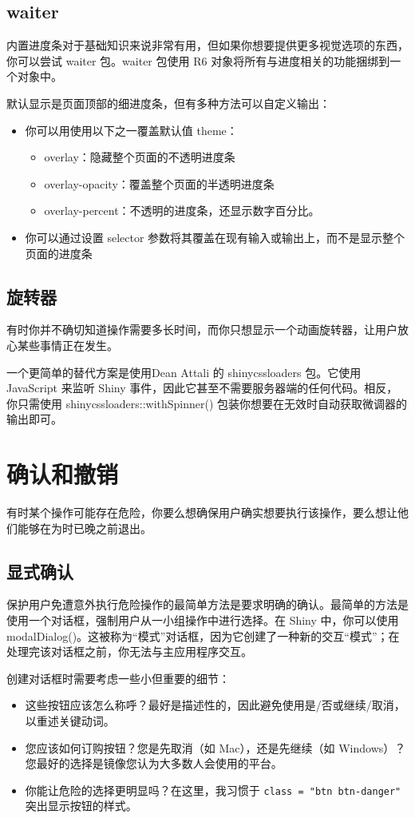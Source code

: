 \subsection{waiter}
内置进度条对于基础知识来说非常有用，但如果你想要提供更多视觉选项的东西，你可以尝试 waiter 包。waiter 包使用 R6 对象将所有与进度相关的功能捆绑到一个对象中。

默认显示是页面顶部的细进度条，但有多种方法可以自定义输出：
\begin{itemize}
    \item 你可以用使用以下之一覆盖默认值 theme：
          \begin{itemize}
              \item overlay：隐藏整个页面的不透明进度条
              \item overlay-opacity：覆盖整个页面的半透明进度条
              \item overlay-percent：不透明的进度条，还显示数字百分比。
          \end{itemize}
    \item 你可以通过设置 selector 参数将其覆盖在现有输入或输出上，而不是显示整个页面的进度条
\end{itemize}

\subsection{旋转器}
有时你并不确切知道操作需要多长时间，而你只想显示一个动画旋转器，让用户放心某些事情正在发生。

一个更简单的替代方案是使用Dean Attali 的 shinycssloaders 包。它使用 JavaScript 来监听 Shiny 事件，因此它甚至不需要服务器端的任何代码。相反，你只需使用 shinycssloaders::withSpinner() 包装你想要在无效时自动获取微调器的输出即可。

\section{确认和撤销}
有时某个操作可能存在危险，你要么想确保用户确实想要执行该操作，要么想让他们能够在为时已晚之前退出。
\subsection{显式确认}
保护用户免遭意外执行危险操作的最简单方法是要求明确的确认。最简单的方法是使用一个对话框，强制用户从一小组操作中进行选择。在 Shiny 中，你可以使用 modalDialog()。这被称为“模式”对话框，因为它创建了一种新的交互“模式”；在处理完该对话框之前，你无法与主应用程序交互。

创建对话框时需要考虑一些小但重要的细节：
\begin{itemize}
    \item 这些按钮应该怎么称呼？最好是描述性的，因此避免使用是/否或继续/取消，以重述关键动词。
    \item 您应该如何订购按钮？您是先取消（如 Mac），还是先继续（如 Windows）？您最好的选择是镜像您认为大多数人会使用的平台。
    \item 你能让危险的选择更明显吗？在这里，我习惯于 \verb|class = "btn btn-danger"| 突出显示按钮的样式。
\end{itemize}

